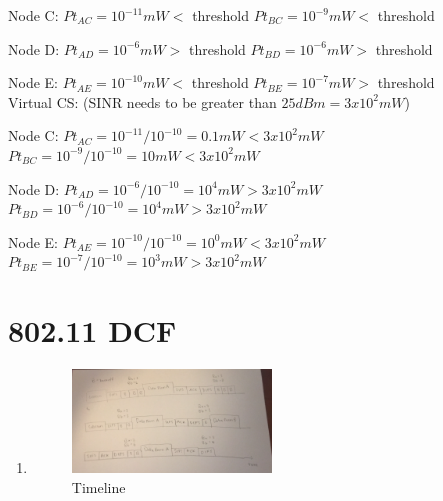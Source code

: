 \documentclass[11pt]{article}
\begin{document}
\begin{enumerate}[label=(\alph*)]
{	Node C:
	$Pt_{AC} = 10^{-11}mW <$ threshold
	$Pt_{BC} = 10^{-9}mW <$ threshold
	
	Node D:
	$Pt_{AD} = 10^{-6}mW >$ threshold
	$Pt_{BD} = 10^{-6}mW >$ threshold
	
	Node E:
	$Pt_{AE} = 10^{-10}mW <$ threshold
	$Pt_{BE} = 10^{-7}mW >$ threshold \\
	
	Virtual CS: (SINR needs to be greater than $25 dBm = 3 x 10^2mW$) 
	
	Node C:
	$Pt_{AC} = 10^{-11}/10^{-10} = 0.1mW < 3 x 10^2mW$
	$Pt_{BC} = 10^{-9}/10^{-10} = 10mW < 3 x 10^2mW$
	
	Node D:
	$Pt_{AD} = 10^{-6}/10^{-10} = 10^{4}mW > 3 x 10^2mW$
	$Pt_{BD} = 10^{-6}/10^{-10} = 10^{4}mW > 3 x 10^2mW$
	
	Node E:
	$Pt_{AE} = 10^{-10}/10^{-10} = 10^{0}mW < 3 x 10^2mW$
	$Pt_{BE} = 10^{-7}/10^{-10} = 10^{3}mW > 3 x 10^2mW$
} 
\end{enumerate}
 


\section{802.11 DCF}
\begin{enumerate}[label=(\alph*)]
\item {
}
\begin{figure}[h] %
\centering
\includegraphics[width=0.5\textwidth]{timeline}
\caption{Timeline}
\end{figure}

\end{enumerate}
\end{document}
